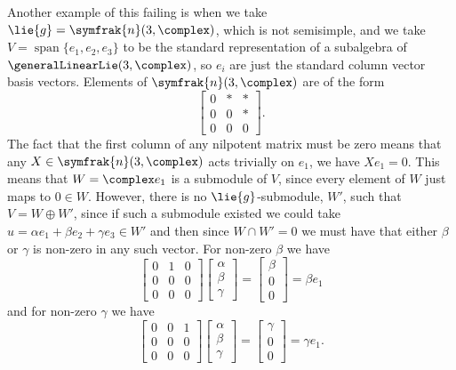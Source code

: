 \documentclass[fleqn]{NotesClass}
\DeclareMathOperator{\Span}{span}
\newcommand{\nilpotentLie}{\symfrak{n}}
\begin{document}
    Another example of this failing is when we take \(\lie{g} = \nilpotentLie(3, \complex)\), which is not semisimple, and we take \(V = \Span\{e_1, e_2, e_3\}\) to be the standard representation of a subalgebra of \(\generalLinearLie(3, \complex)\), so \(e_i\) are just the standard column vector basis vectors.
    Elements of \(\nilpotentLie(3, \complex)\) are of the form
    \begin{equation}
        \begin{bmatrix}
            0 & * & *\\
            0 & 0 & *\\
            0 & 0 & 0
        \end{bmatrix}
        .
    \end{equation}
    The fact that the first column of any nilpotent matrix must be zero means that any \(X \in \nilpotentLie(3, \complex)\) acts trivially on \(e_1\), we have \(X e_1 = 0\).
    This means that \(W = \complex e_1\) is a submodule of \(V\), since every element of \(W\) just maps to \(0 \in W\).
    However, there is no \(\lie{g}\)-submodule, \(W'\), such that \(V = W \oplus W'\), since if such a submodule existed we could take \(u = \alpha e_1 + \beta e_2 + \gamma e_3 \in W'\) and then since \(W \cap W' = 0\) we must have that either \(\beta\) or \(\gamma\) is non-zero in any such vector.
    For non-zero \(\beta\) we have
    \begin{equation}
        \begin{bmatrix}
            0 & 1 & 0\\
            0 & 0 & 0\\
            0 & 0 & 0
        \end{bmatrix}
        \begin{bmatrix}
            \alpha\\ \beta\\ \gamma
        \end{bmatrix}
        =
        \begin{bmatrix}
            \beta\\ 0\\ 0
        \end{bmatrix}
        = \beta e_1
    \end{equation}
    and for non-zero \(\gamma\) we have
    \begin{equation}
        \begin{bmatrix}
            0 & 0 & 1\\
            0 & 0 & 0\\
            0 & 0 & 0
        \end{bmatrix}
        \begin{bmatrix}
            \alpha\\ \beta\\ \gamma
        \end{bmatrix}
        =
        \begin{bmatrix}
            \gamma\\ 0\\ 0
        \end{bmatrix}
        = \gamma e_1.
    \end{equation}
\end{document}
